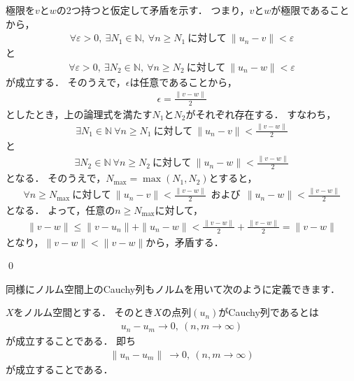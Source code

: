 \begin{Proof}
極限を$v$と$w$の2つ持つと仮定して矛盾を示す．
つまり，$v$と$w$が極限であることから，
\begin{align*}
	\forall \varepsilon > 0, ~ \exists N_1 \in {\mathbb N}, ~ \forall n \ge N_1 ~ \mbox{に対して} ~ \| u_n - v \| < \varepsilon
\end{align*}
と
\begin{align*}
	\forall \varepsilon > 0, ~ \exists N_2 \in {\mathbb N}, ~ \forall n \ge N_2 ~ \mbox{に対して} ~ \| u_n - w \| < \varepsilon
\end{align*}
が成立する．
そのうえで，$\epsilon$は任意であることから，
\begin{align*}
	\epsilon = \frac{ \| v - w \|  }{2}
\end{align*}
としたとき，上の論理式を満たす$N_1$と$N_2$がそれぞれ存在する．
すなわち，
\begin{align*}
	\exists N_1 \in {\mathbb N} ~ \forall n \ge N_1 ~ \mbox{に対して} ~ \| u_n - v \| < \frac{ \| v - w \|  }{2}
\end{align*}
と
\begin{align*}
	\exists N_2 \in {\mathbb N} ~ \forall n \ge N_2 ~ \mbox{に対して} ~ \| u_n - w \| < \frac{ \| v - w \|  }{2}
\end{align*}
となる．
そのうえで，$N_{\max} = \max (N_1, N_2)$とすると，
\begin{align*}
	\forall n \ge N_{\max} ~ \mbox{に対して} ~ \| u_n - v \| < \frac{ \| v - w \|  }{2} ~~ \mbox{および} ~~ \| u_n - w \| < \frac{ \| v - w \|  }{2}
\end{align*}
となる．
よって，任意の$n \ge N_{\max}$に対して，
\begin{align*}
	\| v - w \| \le \| v - u_n \| + \| u_n - w \| < \frac{ \| v - w \|  }{2} + \frac{ \| v - w \|  }{2} = \| v - w \|
\end{align*}
となり，$\| v - w \|  <  \| v - w \|$から，矛盾する．

	\qed
\end{Proof}


同様にノルム空間上のCauchy列もノルムを用いて次のように定義できます．

\begin{defi}[Cauchy列]\label{def:App:Cau}
$X$をノルム空間とする．
そのとき$X$の点列$(u_n)$がCauchy列であるとは
\begin{align*}
u_n - u_m \rightarrow 0, ~ (n,m \rightarrow \infty)
\end{align*}
が成立することである．
即ち
\begin{align*}
\| u_n - u_m \| \ \rightarrow 0, ~  (n,m \rightarrow \infty)
\end{align*}
が成立することである．
\end{defi}

